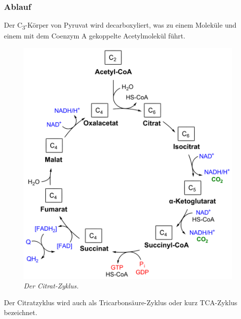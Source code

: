 \subsubsection*{Ablauf}
Der C\textsubscript{3}-Körper von Pyruvat wird decarboxyliert,
was zu einem Moleküle  
und einem mit dem Coenzym A gekoppelte Acetylmolekül führt.

\begin{figure}[ht!]
	\leavevmode
	\begin{center}
		\includegraphics[scale=0.30]{./pictures/citratzyklus_1k}
	\end{center}
	\caption{\slshape{Der Citrat-Zyklus.}}
	\label{fig:calvinDetail}
\end{figure}

Der Citratzyklus wird auch als Tricarbonsäure-Zyklus oder kurz TCA-Zyklus bezeichnet.

